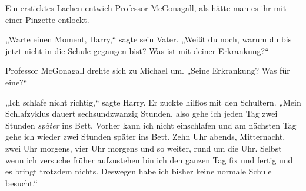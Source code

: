 Ein ersticktes Lachen entwich Professor McGonagall, als hätte man es ihr mit einer Pinzette entlockt.

„Warte einen Moment, Harry,“ sagte sein Vater. „Weißt du noch, warum du bis jetzt nicht in die Schule gegangen bist? Was ist mit deiner Erkrankung?“

Professor McGonagall drehte sich zu Michael um. „Seine Erkrankung? Was für eine?“

„Ich schlafe nicht richtig,“ sagte Harry. Er zuckte hilflos mit den Schultern. „Mein Schlafzyklus dauert sechsundzwanzig Stunden, also gehe ich jeden Tag zwei Stunden \emph{später} ins Bett. Vorher kann ich nicht einschlafen und am nächsten Tag gehe ich wieder zwei Stunden später ins Bett. Zehn Uhr abends, Mitternacht, zwei Uhr morgens, vier Uhr morgens und so weiter, rund um die Uhr. Selbst wenn ich versuche früher aufzustehen bin ich den ganzen Tag fix und fertig und es bringt trotzdem nichts. Deswegen habe ich bisher keine normale Schule besucht.“

